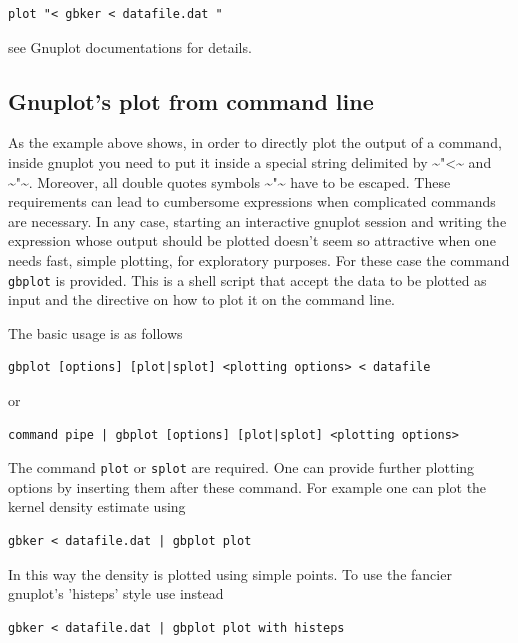 \documentclass[11pt]{article}
\begin{document}
\begin{verbatim}
plot "< gbker < datafile.dat " 
\end{verbatim}

see Gnuplot documentations for details.
\subsection{Gnuplot's plot from command line}
\label{sec-5-3}

As the example above shows, in order to directly plot the output of a
command, inside gnuplot you need to put it inside a special string
delimited by \textasciitilde{}"<\textasciitilde{} and \textasciitilde{}"\textasciitilde{}. Moreover, all double quotes symbols \textasciitilde{}"\textasciitilde{}
have to be escaped. These requirements can lead to cumbersome
expressions when complicated commands are necessary. In any case,
starting an interactive gnuplot session and writing the expression
whose output should be plotted doesn't seem so attractive when one
needs fast, simple plotting, for exploratory purposes. For these case
the command \texttt{gbplot} is provided. This is a shell script that accept
the data to be plotted as input and the directive on how to plot it on
the command line.

The basic usage is as follows

\begin{verbatim}
gbplot [options] [plot|splot] <plotting options> < datafile
\end{verbatim}

or

\begin{verbatim}
command pipe | gbplot [options] [plot|splot] <plotting options>
\end{verbatim}

The command \texttt{plot} or \texttt{splot} are required. One can provide further
plotting options by inserting them after these command. For example
one can plot the kernel density estimate using

\begin{verbatim}
gbker < datafile.dat | gbplot plot
\end{verbatim}

In this way the density is plotted using simple points. To use the
fancier gnuplot's 'histeps' style use instead

\begin{verbatim}
gbker < datafile.dat | gbplot plot with histeps
\end{verbatim}
\end{document}
